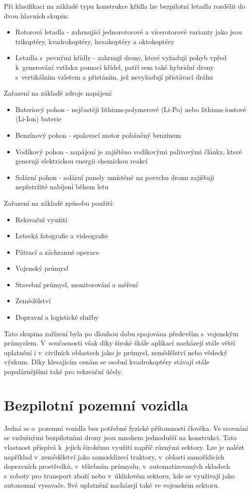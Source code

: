 \documentclass[12pt]{report}
\begin{document}
Při klasifikaci na základě typu konstrukce křídla lze bezpilotní letadla rozdělit do dvou hlavních skupin:
\begin{itemize}
	\item Rotorová letadla - zahrnující jednorotorové a vícerotorové varianty jako jsou trikoptéry, kvadrokoptéry, hexakoptéry a oktokoptéry
	\item Letadla s~pevnými křídly - zahrnují drony, které vyžadují pohyb vpřed k~generování vztlaku pomocí křídel, patří sem také hybridní drony s~vertikálním vzletem a přistáním, jež nevyžadují přistávací dráhu
\end{itemize}

Zařazení na základě zdroje napájení:
\begin{itemize}
	\item Bateriový pohon - nejčastěji lithium-polymerové (Li-Po) nebo lithium-iontové (Li-Ion) baterie
	\item Benzínový pohon - spalovací motor poháněný benzínem
	\item Vodíkový pohon - napájení je zajištěno vodíkovými palivovými články, které generují elektrickou energii chemickou reakcí
	\item Solární pohon - solární panely umístěné na povrchu dronu zajišťují nepřetržité nabíjení během letu
\end{itemize}

Zařazení na základě způsobu použití:
\begin{itemize}
	\item Rekreační využití
	\item Letecká fotografie a videografie
	\item Pátrací a záchranné operace
	\item Vojenský průmysl
	\item Stavební průmysl, monitorování a měření
	\item Zemědělství
	\item Dopravní a logistické služby
\end{itemize}

Tato skupina zařízení byla po dlouhou dobu spojována především s~vojenským průmyslem. V~současnosti však díky široké škále aplikací nacházejí stále větší uplatnění i v~civilních oblastech jako je průmysl, zemědělství nebo vědecký výzkum. Díky klesajícím cenám se osobní kvadrokoptéry stávají stále populárnějšími také pro rekreační účely. \cite{mainbook} \cite{whatisadrone}

\section[Bezpilotní pozemní vozidla]{Bezpilotní pozemní vozidla}
Jedná se o~pozemní vozidla bez potřebné fyzické přítomnosti člověka. Ve srovnání se vzdušnými bezpilotními drony jsou mnohem jednodušší na konstrukci. Tato vlastnost přispívá k~jejich širokému využití napříč různými sektory. Lze je nalézt například v~zemědělství jako samosklízecí traktory, v~oblasti samořídicích dopravních prostředků, v~těžebním průmyslu, v~automatizovaných skladech s~roboty pro transport zboží nebo v~úklidovém sektoru, kde se využívají jako autonomní vysavače. Své uplatnění nacházejí také ve vojenském sektoru. \cite{mainbook}
\end{document}
